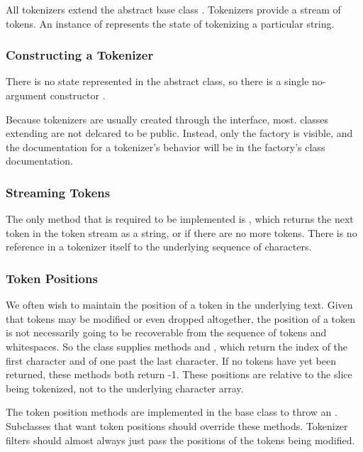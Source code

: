 All tokenizers extend the abstract base class .
Tokenizers provide a stream of tokens.  An instance of
 represents the state of tokenizing a particular
string.  

\subsubsection{Constructing a Tokenizer}

There is no state represented in the  abstract class,
so there is a single no-argument constructor .

Because tokenizers are usually created through the 
 interface, most.
classes extending  are not delcared to be public.
Instead, only the factory is visible, and the documentation for a
tokenizer's behavior will be in the factory's class documentation.

\subsubsection{Streaming Tokens}

The only method that is required to be implemented is
, which returns the next token in the token stream
as a string, or  if there are no more tokens.  There is no
reference in a tokenizer itself to the underlying sequence of
characters.  

\subsubsection{Token Positions}

We often wish to maintain the position of a token in the underlying
text.  Given that tokens may be modified or even dropped altogether,
the position of a token is not necessarily going to be recoverable
from the sequence of tokens and whitespaces.  So the 
class supplies methods  and
, which return the index of the first
character and of one past the last character.  If no tokens have yet
been returned, these methods both return -1.  These positions are
relative to the slice being tokenized, not to the underlying character
array.  

The token position methods are implemented in the 
base class to throw an .
Subclasses that want token positions should override these methods.
Tokenizer filters should almost always just pass the positions of the
tokens being modified.

